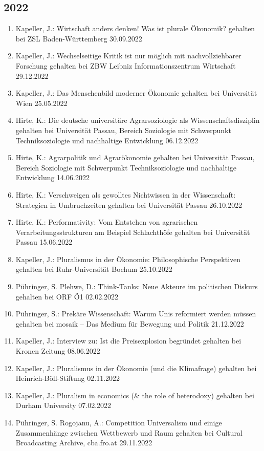 \subsection*{2022}
\begin{enumerate}
	\item Kapeller, J.: Wirtschaft anders denken! Was ist plurale Ökonomik? gehalten bei ZSL Baden-Württemberg 30.09.2022
	\item Kapeller, J.: Wechselseitige Kritik ist nur möglich mit nachvollziehbarer Forschung gehalten bei ZBW Leibniz Informationszentrum Wirtschaft 29.12.2022
	\item Kapeller, J.: Das Menschenbild moderner Ökonomie gehalten bei Universität Wien 25.05.2022
	\item Hirte, K.: Die deutsche universitäre Agrarsoziologie als Wissenschaftsdisziplin gehalten bei Universität Passau, Bereich Soziologie mit Schwerpunkt Techniksoziologie und nachhaltige Entwicklung 06.12.2022
	\item Hirte, K.: Agrarpolitik und Agrarökonomie gehalten bei Universität Passau, Bereich Soziologie mit Schwerpunkt Techniksoziologie und nachhaltige Entwicklung 14.06.2022
	\item Hirte, K.: Verschweigen als gewolltes Nichtwissen in der Wissenschaft: Strategien in Umbruchzeiten gehalten bei Universität Passau 26.10.2022
	\item Hirte, K.: Performativity: Vom Entstehen von agrarischen Verarbeitungsstrukturen am Beispiel Schlachthöfe gehalten bei Universität Passau 15.06.2022
	\item Kapeller, J.: Pluralismus in der Ökonomie: Philosophische Perspektiven gehalten bei Ruhr-Universität Bochum 25.10.2022
	\item Pühringer, S. Plehwe, D.: Think-Tanks: Neue Akteure im politischen Diskurs gehalten bei ORF Ö1 02.02.2022
	\item Pühringer, S.: Prekäre Wissenschaft: Warum Unis reformiert werden müssen gehalten bei mosaik -- Das Medium für Bewegung und Politik 21.12.2022
	\item Kapeller, J.: Interview zu: Ist die Preisexplosion begründet gehalten bei Kronen Zeitung 08.06.2022
	\item Kapeller, J.: Pluralismus in der Ökonomie (und die Klimafrage) gehalten bei Heinrich-Böll-Stiftung 02.11.2022
	\item Kapeller, J.: Pluralism in economics (\& the role of heterodoxy) gehalten bei Durham University 07.02.2022
	\item Pühringer, S. Rogojanu, A.: Competition Universalism und einige Zusammenhänge zwischen Wettbewerb und Raum gehalten bei Cultural Broadcasting Archive, cba.fro.at 29.11.2022

\end{enumerate}
